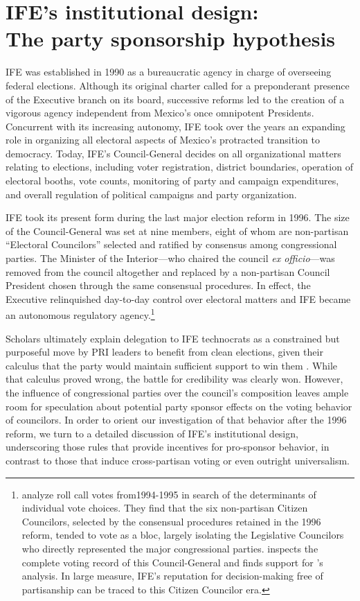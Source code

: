 \documentclass[12 pt, letter]{article}
\begin{document}
\singlespacing
\section{IFE's institutional design:\\  The party sponsorship hypothesis}\label{S:description}
\doublespacing
IFE was established in 1990 as a bureaucratic agency in charge of overseeing federal elections.  Although its original charter called for a preponderant presence of the Executive branch on its board, successive reforms led to the creation of a vigorous agency independent from Mexico's once omnipotent Presidents. Concurrent with its increasing autonomy, IFE took over the years an expanding role in organizing all electoral aspects of Mexico's protracted transition to democracy.  Today, IFE's Council-General decides on all organizational matters relating to elections, including voter registration, district boundaries, operation of electoral booths, vote counts, monitoring of party and campaign expenditures, and overall regulation of political campaigns and party organization.

IFE took its present form during the last major election reform in 1996.  The size of the Council-General was set at nine members, eight of whom are non-partisan ``Electoral Councilors'' selected and ratified by consensus among congressional parties.  The Minister of the Interior---who chaired the council \emph{ex officio}---was removed from the council altogether and replaced by a non-partisan Council President chosen through the same consensual procedures.  In effect, the Executive relinquished day-to-day control over electoral matters and IFE became an autonomous regulatory agency.\footnote{\citet{Malo1996} analyze roll call votes from1994-1995 in search of the determinants of individual vote choices. They find that the six non-partisan Citizen Councilors, selected by the consensual procedures retained in the 1996 reform, tended to vote as a bloc, largely isolating the Legislative Councilors who directly represented the major congressional parties.  \citet{Rosas2004} inspects the complete voting record of this Council-General and finds support for \citeauthor{Malo1996}'s analysis.  In large measure, IFE's reputation for decision-making free of partisanship can be traced to this Citizen Councilor era.}

Scholars ultimately explain delegation to IFE technocrats as a constrained but purposeful move by PRI leaders to benefit from clean elections, given their calculus that the party would maintain sufficient support to win them \citep{Magaloni2006}.  While that calculus proved wrong, the battle for credibility was clearly won. However, the influence of congressional parties over the council's composition leaves ample room for speculation about potential party sponsor effects on the voting behavior of councilors.  In order to orient our investigation of that behavior after the 1996 reform, we turn to a detailed discussion of IFE's institutional design, underscoring those rules that provide incentives for pro-sponsor behavior, in contrast to those that induce cross-partisan voting or even outright universalism.
\end{document}

